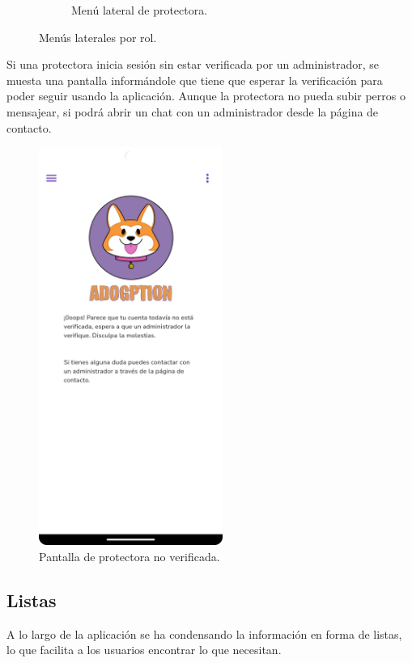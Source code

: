\documentclass[a4paper, 12pt]{article}
\begin{document}
\begin{figure}[H]
\begin{subfigure}{0.48\textwidth}
\begin{center}
			\caption{Menú lateral de protectora.}
		\end{center}  
	\end{subfigure}\hfill
	\caption{Menús laterales por rol.}
\end{figure}


Si una protectora inicia sesión sin estar verificada por un administrador, se muesta una pantalla informándole que tiene que esperar la verificación para poder seguir usando la aplicación. Aunque la protectora no pueda subir perros o mensajear, si podrá abrir un chat con un administrador desde la página de contacto.


\begin{figure}[H]
	\begin{center}
		{\includegraphics[width=6cm]{app/UnverifiedPage.png}\par}
		\caption{Pantalla de protectora no verificada.}
	\end{center}  
\end{figure}



\newpage
\subsection*{Listas}

A lo largo de la aplicación se ha condensando la información en forma de listas, lo que facilita a los usuarios encontrar lo que necesitan.
\end{document}
